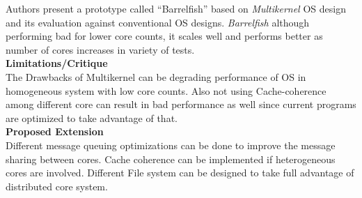 \documentclass[a4paper, 10pt]{article}
\begin{document}
Authors present a prototype called ``Barrelfish'' based on \emph{Multikernel} OS design and its evaluation against conventional OS designs. \emph{Barrelfish} although performing bad for lower core counts, it scales well and performs better as number of cores increases in variety of tests.\\
 
\noindent
\large\textbf{Limitations/Critique}\\
The Drawbacks of Multikernel can be degrading performance of OS in homogeneous system with low core counts. Also not using Cache-coherence among different core can result in bad performance as well since current programs are optimized to take advantage of that.\\ 

\noindent
\large\textbf{Proposed Extension}\\
Different message queuing optimizations can be done to improve the message sharing between cores. Cache coherence can be implemented if heterogeneous cores are involved. Different File system can be designed to take full advantage of distributed core system. 
\end{document}
